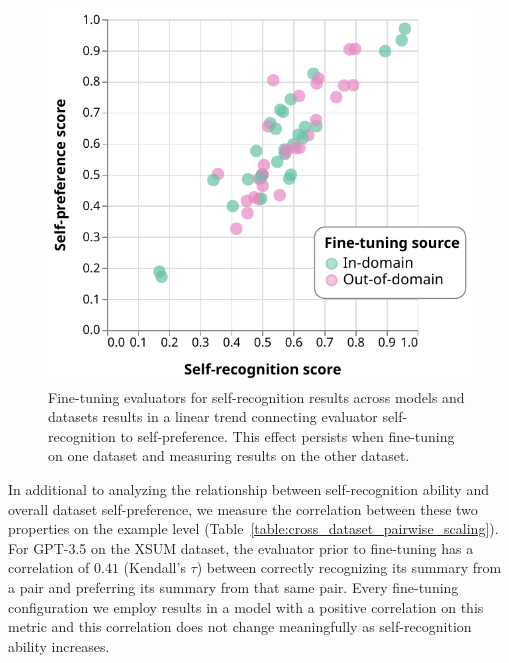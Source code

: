 \documentclass{article}
\theoremstyle{plain}
\theoremstyle{definition}
\theoremstyle{remark}
\begin{document}
\begin{figure}[h] \centering
\includegraphics[width=\columnwidth]{images/finetune_all_models.pdf}
\caption{Fine-tuning evaluators for self-recognition results across models and datasets results in a linear trend connecting evaluator self-recognition to self-preference. This effect persists when fine-tuning on one dataset and measuring results on the other dataset.}
\label{fig:cross_dataset_transfer}
\end{figure}

In additional to analyzing the relationship between self-recognition ability and overall dataset self-preference, we measure the correlation between these two properties on the example level (Table~\ref{table:cross_dataset_pairwise_scaling}). For GPT-3.5 on the XSUM dataset, the evaluator prior to fine-tuning has a correlation of $0.41$ (Kendall's $\tau$) between correctly recognizing its summary from a pair and preferring its summary from that same pair. Every fine-tuning configuration we employ results in a model with a positive correlation on this metric and this correlation does not change meaningfully as self-recognition ability increases. %
\end{document}
